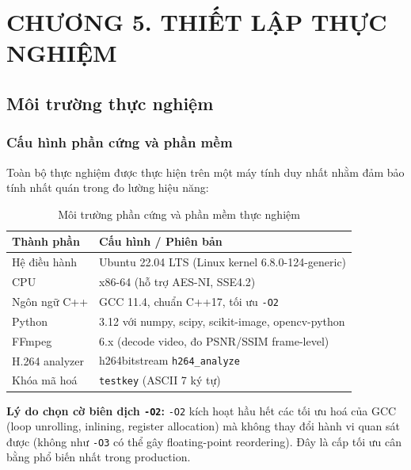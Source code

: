 \clearpage
{}
\section*{CHƯƠNG 5. THIẾT LẬP THỰC NGHIỆM}
\setcounter{section}{5}
\setcounter{subsection}{0}
\setcounter{figure}{0}
\setcounter{table}{0}
\setcounter{equation}{0}

\subsection{Môi trường thực nghiệm}

\subsubsection{Cấu hình phần cứng và phần mềm}

Toàn bộ thực nghiệm được thực hiện trên một máy tính duy nhất nhằm đảm bảo
tính nhất quán trong đo lường hiệu năng:

\begin{table}[ht]
\centering
\caption{Môi trường phần cứng và phần mềm thực nghiệm}
\label{tab:env}
\begin{tabular}{ll}
\toprule
Thành phần & Cấu hình / Phiên bản \\
\midrule
Hệ điều hành        & Ubuntu 22.04 LTS (Linux kernel 6.8.0-124-generic) \\
CPU                  & x86-64 (hỗ trợ AES-NI, SSE4.2) \\
Ngôn ngữ C++         & GCC 11.4, chuẩn C++17, tối ưu \texttt{-O2} \\
Python               & 3.12 với numpy, scipy, scikit-image, opencv-python \\
FFmpeg               & 6.x (decode video, đo PSNR/SSIM frame-level) \\
H.264 analyzer       & h264bitstream \texttt{h264\_analyze} \cite{h264bitstream} \\
Khóa mã hoá         & \texttt{testkey} (ASCII 7 ký tự) \\
\bottomrule
\end{tabular}
\end{table}

\textbf{Lý do chọn cờ biên dịch \texttt{-O2}:}
\texttt{-O2} kích hoạt hầu hết các tối ưu hoá của GCC (loop unrolling, inlining,
register allocation) mà không thay đổi hành vi quan sát được (không như \texttt{-O3}
có thể gây floating-point reordering). Đây là cấp tối ưu cân bằng phổ biến nhất
trong production.

